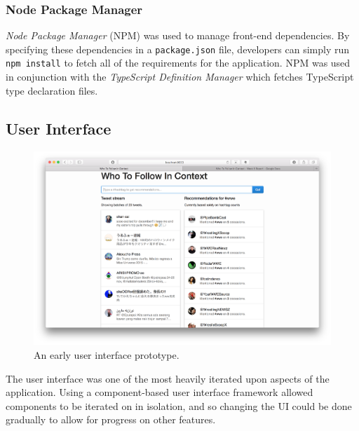 \documentclass{l4proj}
\newcommand{\code}[1]{\texttt{#1}}
\begin{document}
        \subsubsection{Node Package Manager}
        \textit{Node Package Manager} (NPM) was used to manage front-end dependencies. By specifying these dependencies in a \code{package.json} file, developers can simply run \code{npm install} to fetch all of the requirements for the application. NPM was used in conjunction with the \textit{TypeScript Definition Manager} which fetches TypeScript type declaration files.
        
        \subsection{User Interface}
\begin{figure}
\centering
\includegraphics[scale=0.24]{initialui.png}
\caption{An early user interface prototype.}
\label{initialui}
\end{figure} 
        
        The user interface was one of the most heavily iterated upon aspects of the application. Using a component-based user interface framework allowed components to be iterated on in isolation, and so changing the UI could be done gradually to allow for progress on other features.
        
\end{document}
